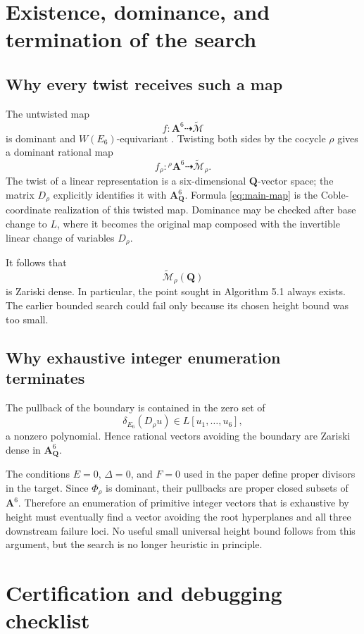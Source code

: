 \documentclass[11pt]{article}
\newcommand{\QQ}{\mathbf{Q}}
\newcommand{\Aff}{\mathbf{A}}
\newcommand{\tcM}{\widetilde{\mathcal{M}}}
\newcommand{\deltaE}{\delta_{E_6}}
\begin{document}
\section{Existence, dominance, and termination of the search}

\subsection{Why every twist receives such a map}

The untwisted map
\[
  f:\Aff^6\dashrightarrow\tcM
\]
is dominant and $W(E_6)$-equivariant \cite[Lemma 6.1]{DR-PR}.  Twisting both sides
by the cocycle $\rho$ gives a dominant rational map
\[
  f_\rho:{}^\rho\Aff^6\dashrightarrow\tcM_\rho.
\]
The twist of a linear representation is a six-dimensional $\QQ$-vector space; the
matrix $D_\rho$ explicitly identifies it with $\Aff^6_\QQ$.  Formula
\eqref{eq:main-map} is the Coble-coordinate realization of this twisted map.
Dominance may be checked after base change to $L$, where it becomes the original
map composed with the invertible linear change of variables $D_\rho$.

It follows that
\[
  \tcM_\rho(\QQ)
\]
is Zariski dense.  In particular, the point sought in Algorithm 5.1 always exists.
The earlier bounded search could fail only because its chosen height bound was too
small.

\subsection{Why exhaustive integer enumeration terminates}

The pullback of the boundary is contained in the zero set of
\[
  \deltaE(D_\rho u)\in L[u_1,\ldots,u_6],
\]
a nonzero polynomial.  Hence rational vectors avoiding the boundary are Zariski
dense in $\Aff^6_\QQ$.

The conditions $E=0$, $\Delta=0$, and $F=0$ used in the paper define proper
divisors in the target.  Since $\Phi_\rho$ is dominant, their pullbacks are proper
closed subsets of $\Aff^6$.  Therefore an enumeration of primitive integer vectors
that is exhaustive by height must eventually find a vector avoiding the root
hyperplanes and all three downstream failure loci.  No useful small universal
height bound follows from this argument, but the search is no longer heuristic in
principle.

\section{Certification and debugging checklist}
\end{document}
